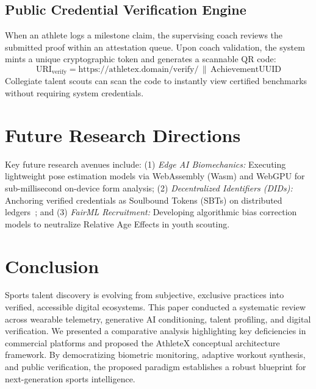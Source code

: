 \documentclass[conference]{IEEEtran}
\begin{document}
\subsection{Public Credential Verification Engine}
When an athlete logs a milestone claim, the supervising coach reviews the submitted proof within an attestation queue. Upon coach validation, the system mints a unique cryptographic token and generates a scannable QR code:
\begin{equation}
\text{URI}_{\text{verify}} = \text{https://athletex.domain/verify/} \, \parallel \, \text{AchievementUUID}
\end{equation}
Collegiate talent scouts can scan the code to instantly view certified benchmarks without requiring system credentials.

\section{Future Research Directions}
Key future research avenues include: (1) \textit{Edge AI Biomechanics:} Executing lightweight pose estimation models via WebAssembly (Wasm) and WebGPU for sub-millisecond on-device form analysis; (2) \textit{Decentralized Identifiers (DIDs):} Anchoring verified credentials as Soulbound Tokens (SBTs) on distributed ledgers~\cite{weyl2022}; and (3) \textit{FairML Recruitment:} Developing algorithmic bias correction models to neutralize Relative Age Effects in youth scouting.

\section{Conclusion}
Sports talent discovery is evolving from subjective, exclusive practices into verified, accessible digital ecosystems. This paper conducted a systematic review across wearable telemetry, generative AI conditioning, talent profiling, and digital verification. We presented a comparative analysis highlighting key deficiencies in commercial platforms and proposed the AthleteX conceptual architecture framework. By democratizing biometric monitoring, adaptive workout synthesis, and public verification, the proposed paradigm establishes a robust blueprint for next-generation sports intelligence.
\end{document}
